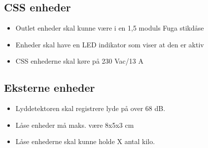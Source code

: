 \subsection*{CSS enheder}
\begin{itemize}
\item Outlet enheder skal kunne være i en 1,5 moduls Fuga stikdåse
\item Enheder skal have en LED indikator som viser at den er aktiv
\item CSS enhederne skal køre på 230 Vac/13 A
\end{itemize}

\subsection*{Eksterne enheder}
\begin{itemize}
\item Lyddetektoren skal registrere lyde på over 68 dB.
\item Låse enheder må maks. være 8x5x3 cm
\item Låse enhederne skal kunne holde X antal kilo.
\end{itemize}

